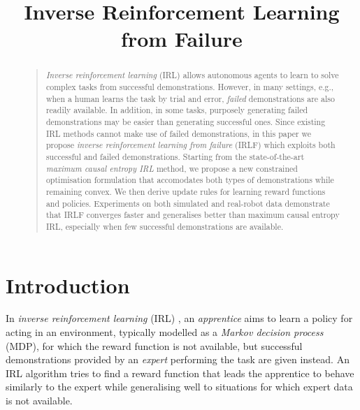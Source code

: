 \documentclass[letterpaper]{article}
\begin{document}
%
\title{Inverse Reinforcement Learning from Failure}
\maketitle
\begin{abstract}
\begin{quote}

\emph{Inverse reinforcement learning} (IRL) allows autonomous agents to learn to solve complex tasks from successful demonstrations.  However, in many settings, e.g., when a human learns the task by trial and error, \emph{failed} demonstrations are also readily available.  In addition, in some tasks, purposely generating failed demonstrations may be easier than generating successful ones.  Since existing IRL methods cannot make use of failed demonstrations, in this paper we propose \emph{inverse reinforcement learning from failure} (IRLF) which exploits both successful and failed demonstrations.  Starting from the state-of-the-art \emph{maximum causal entropy IRL} method, we propose a new constrained optimisation formulation that accomodates both types of demonstrations while remaining convex.  We then derive update rules for learning reward functions and policies. Experiments on both simulated and real-robot data demonstrate that IRLF converges faster and generalises better than maximum causal entropy IRL, especially when few successful demonstrations are available.

\end{quote}
\end{abstract}

\section{Introduction}

In \emph{inverse reinforcement learning} (IRL) \cite{ng2000algorithms}, an \emph{apprentice} aims to learn a policy for acting in an environment, typically modelled as a \emph{Markov decision process} (MDP), for which the reward function is not available, but successful demonstrations provided by an \emph{expert} performing the task are given instead. An IRL algorithm tries to find a reward function that leads the apprentice to behave  similarly to the expert while generalising well to situations for which expert data is not available. 
\end{document}
